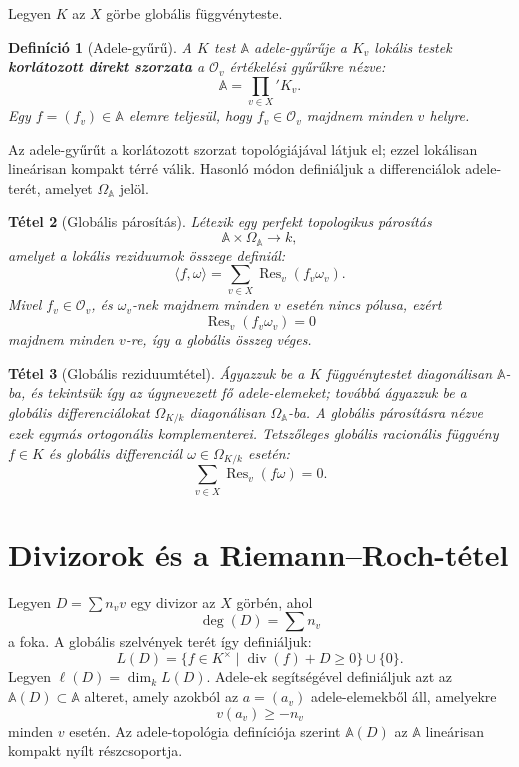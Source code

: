 \documentclass[12pt]{article}
\newtheorem{theorem}{Tétel}[section]
\newtheorem{definition}[theorem]{Definíció}
\begin{document}
Legyen $K$ az $X$ görbe globális függvényteste.

\begin{definition}[Adele-gyűrű]
  A $K$ test $\mathbb{A}$ \emph{adele-gyűrűje} a $K_v$ lokális testek \textbf{korlátozott direkt szorzata} a $\mathcal{O}_v$ értékelési gyűrűkre nézve:
  \[
    \mathbb{A} = \prod_{v \in X}\nolimits' K_v.
  \]
  Egy $f = (f_v) \in \mathbb{A}$ elemre teljesül, hogy $f_v \in \mathcal{O}_v$ majdnem minden $v$ helyre.
\end{definition}

Az adele-gyűrűt a korlátozott szorzat topológiájával látjuk el; ezzel lokálisan lineárisan kompakt térré válik. Hasonló módon definiáljuk a differenciálok adele-terét, amelyet $\Omega_{\mathbb{A}}$ jelöl.

\begin{theorem}[Globális párosítás]
  Létezik egy perfekt topologikus párosítás
  \[
    \mathbb{A} \times \Omega_{\mathbb{A}} \to k,
  \]
  amelyet a lokális reziduumok összege definiál:
  \[
    \langle f, \omega \rangle = \sum_{v \in X} \operatorname{Res}_v(f_v \omega_v).
  \]
  Mivel $f_v \in \mathcal{O}_v$, és $\omega_v$-nek majdnem minden $v$ esetén nincs pólusa, ezért
  \[
    \operatorname{Res}_v(f_v \omega_v) = 0
  \]
  majdnem minden $v$-re, így a globális összeg véges.
\end{theorem}

\begin{theorem}[Globális reziduumtétel]
  Ágyazzuk be a $K$ függvénytestet diagonálisan $\mathbb{A}$-ba, és tekintsük így az úgynevezett fő adele-elemeket; továbbá ágyazzuk be a globális differenciálokat $\Omega_{K/k}$ diagonálisan $\Omega_{\mathbb{A}}$-ba. A globális párosításra nézve ezek egymás ortogonális komplementerei. Tetszőleges globális racionális függvény $f \in K$ és globális differenciál $\omega \in \Omega_{K/k}$ esetén:
  \[
    \sum_{v \in X} \operatorname{Res}_v(f \omega) = 0.
  \]
\end{theorem}

\section{Divizorok és a Riemann--Roch-tétel}

Legyen $D = \sum n_v v$ egy divizor az $X$ görbén, ahol
\[
  \deg(D) = \sum n_v
\]
a foka. A globális szelvények terét így definiáljuk:
\[
  L(D) = \{ f \in K^\times \mid \operatorname{div}(f) + D \ge 0 \} \cup \{0\}.
\]
Legyen $\ell(D) = \dim_k L(D)$. Adele-ek segítségével definiáljuk azt az $\mathbb{A}(D) \subset \mathbb{A}$ alteret, amely azokból az $a = (a_v)$ adele-elemekből áll, amelyekre
\[
  v(a_v) \ge -n_v
\]
minden $v$ esetén. Az adele-topológia definíciója szerint $\mathbb{A}(D)$ az $\mathbb{A}$ lineárisan kompakt nyílt részcsoportja.
\end{document}
